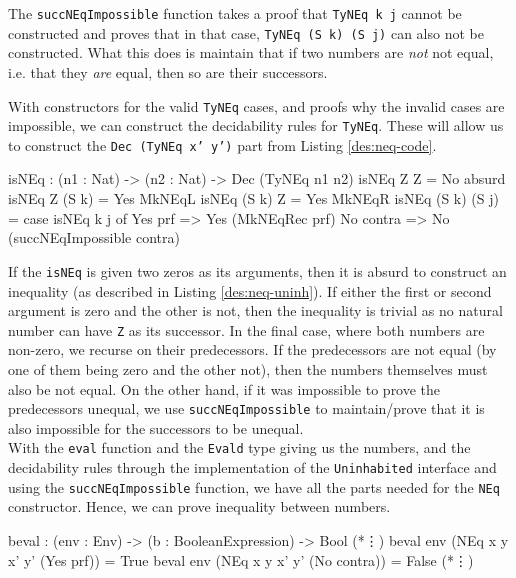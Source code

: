         The \texttt{succNEqImpossible} function takes a proof that \texttt{TyNEq k j} cannot be constructed and proves that in that case, \texttt{TyNEq (S k) (S j)} can also not be constructed. What this does is maintain that if two numbers are \textit{not} not equal, i.e. that they \textit{are} equal, then so are their successors.\par
        With constructors for the valid \texttt{TyNEq} cases, and proofs why the invalid cases are impossible, we can construct the decidability rules for \texttt{TyNEq}. These will allow us to construct the \texttt{Dec (TyNEq x' y')} part from Listing \ref{des:neq-code}.
        
        \begin{code}[caption={Decidability rules for \texttt{NEq}}]
isNEq : (n1 : Nat) -> (n2 : Nat) -> Dec (TyNEq n1 n2)
isNEq Z Z         = No absurd
isNEq Z (S k)     = Yes MkNEqL
isNEq (S k) Z     = Yes MkNEqR
isNEq (S k) (S j) = case isNEq k j of
                        Yes prf   => Yes (MkNEqRec prf)
                        No contra => No (succNEqImpossible contra)
        \end{code}
        
        If the \texttt{isNEq} is given two zeros as its arguments, then it is absurd to construct an inequality (as described in Listing \ref{des:neq-uninh}). If either the first or second argument is zero and the other is not, then the inequality is trivial as no natural number can have \texttt{Z} as its successor. In the final case, where both numbers are non-zero, we recurse on their predecessors. If the predecessors are not equal (by one of them being zero and the other not), then the numbers themselves must also be not equal. On the other hand, if it was impossible to prove the predecessors unequal, we use \texttt{succNEqImpossible} to maintain/prove that it is also impossible for the successors to be unequal.
        \\
        
        With the \texttt{eval} function and the \texttt{Evald} type giving us the numbers, and the decidability rules through the implementation of the \texttt{Uninhabited} interface and using the \texttt{succNEqImpossible} function, we have all the parts needed for the \texttt{NEq} constructor. Hence, we can prove inequality between numbers.
        
        \begin{code}[caption={Evaluating \texttt{NEq} over an environment}, escapeinside={(*}{*)}]
        beval : (env : Env) -> (b : BooleanExpression) -> Bool
        (*\vdots*)
        beval env (NEq x y x' y' (Yes prf))   = True
        beval env (NEq x y x' y' (No contra)) = False
        (*\vdots*)
        \end{code}
    
